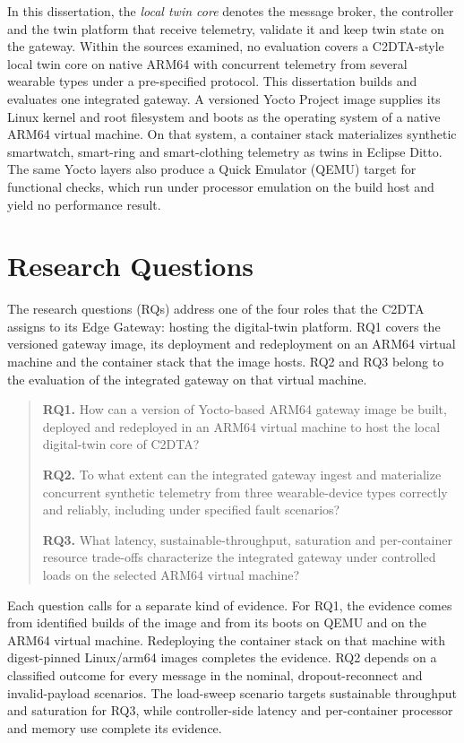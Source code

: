 In this dissertation, the \emph{local twin core} denotes the message broker, the controller and the twin platform that receive telemetry, validate it and keep twin state on the gateway. Within the sources examined, no evaluation covers a C2DTA-style local twin core on native ARM64 with concurrent telemetry from several wearable types under a pre-specified protocol. This dissertation builds and evaluates one integrated gateway. A versioned Yocto Project image supplies its Linux kernel and root filesystem and boots as the operating system of a native ARM64 virtual machine. On that system, a container stack materializes synthetic smartwatch, smart-ring and smart-clothing telemetry as twins in Eclipse Ditto. The same Yocto layers also produce a Quick Emulator (QEMU) target for functional checks, which run under processor emulation on the build host and yield no performance result.

\section{Research Questions}\label{research-questions}

\noindent The research questions (RQs) address one of the four roles that the C2DTA assigns to its Edge Gateway: hosting the digital-twin platform\cite{word06}. RQ1 covers the versioned gateway image, its deployment and redeployment on an ARM64 virtual machine and the container stack that the image hosts. RQ2 and RQ3 belong to the evaluation of the integrated gateway on that virtual machine.

\begin{quote}
\textbf{RQ1.} How can a version of Yocto-based ARM64 gateway image be built, deployed and redeployed in an ARM64 virtual machine to host the local digital-twin core of C2DTA?

\textbf{RQ2.} To what extent can the integrated gateway ingest and materialize concurrent synthetic telemetry from three wearable-device types correctly and reliably, including under specified fault scenarios?

\textbf{RQ3.} What latency, sustainable-throughput, saturation and per-container resource trade-offs characterize the integrated gateway under controlled loads on the selected ARM64 virtual machine?
\end{quote}

Each question calls for a separate kind of evidence. For RQ1, the evidence comes from identified builds of the image and from its boots on QEMU and on the ARM64 virtual machine. Redeploying the container stack on that machine with digest-pinned Linux/arm64 images completes the evidence. RQ2 depends on a classified outcome for every message in the nominal, dropout-reconnect and invalid-payload scenarios. The load-sweep scenario targets sustainable throughput and saturation for RQ3, while controller-side latency and per-container processor and memory use complete its evidence.

